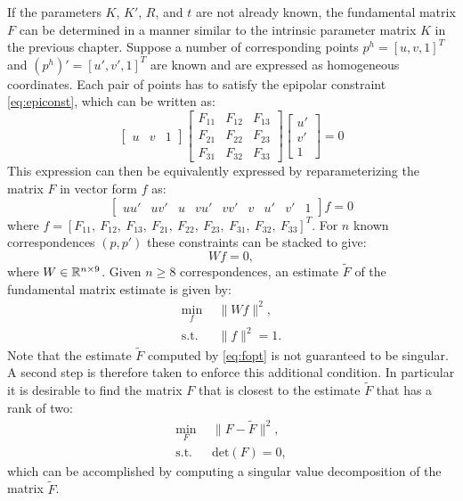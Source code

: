 If the parameters $K$, $K'$, $R$, and $t$ are not already known, the fundamental matrix $F$ can be determined in a manner similar to the intrinsic parameter matrix $K$ in the previous chapter. Suppose a number of corresponding points $p^h = [u, v, 1]^T$ and $(p^h)'= [u',v',1]^T$ are known and are expressed as homogeneous coordinates. Each pair of points has to satisfy the epipolar constraint \eqref{eq:epiconst}, which can be written as:
\begin{equation*}
\begin{bmatrix}
u & v & 1
\end{bmatrix} \begin{bmatrix}
F_{11} & F_{12} & F_{13} \\
F_{21} & F_{22} & F_{23} \\
F_{31} & F_{32} & F_{33}
\end{bmatrix} \begin{bmatrix}
u' \\ v' \\ 1
\end{bmatrix} = 0    
\end{equation*}
This expression can then be equivalently expressed by reparameterizing the matrix $F$ in vector form $f$ as:
\begin{equation}
\begin{bmatrix}
uu' & uv' & u & vu' & vv' & v & u' & v' & 1
\end{bmatrix}f = 0
\end{equation}
where $f = [F_{11}, \:F_{12} , \: F_{13}, \:F_{21}, \:F_{22}, \:F_{23}, \:F_{31}, \:F_{32}, \:F_{33}]^T$. For $n$ known correspondences $(p,p')$ these constraints can be stacked to give:
\begin{equation}
    Wf = 0,
\end{equation}
where $W \in \mathbb{R}^{n \times 9}$.
Given $n \geq 8$ correspondences, an estimate $\tilde{F}$ of the fundamental matrix estimate is given by:
\begin{equation} \label{eq:fopt}
\begin{split}
\min_{f} \:\:& \lVert Wf \rVert^2, \\
\text{s.t.} \:\:& \lVert f \rVert^2 = 1.
\end{split}
\end{equation}
Note that the estimate $\tilde{F}$ computed by \eqref{eq:fopt} is not guaranteed to be singular. A second step is therefore taken to enforce this additional condition. In particular it is desirable to find the matrix $F$ that is closest to the estimate $\tilde{F}$ that has a rank of two:
\begin{equation}
\begin{split}
   \min_F \:\:& \lVert F-\tilde{F}\rVert^2, \\
\text{s.t.} \:\:& \text{det}(F) = 0,
\end{split}
\end{equation}
which can be accomplished by computing a singular value decomposition of the matrix $\tilde{F}$.

